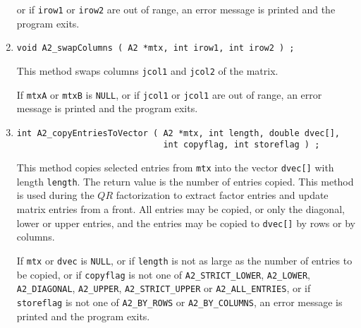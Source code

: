 \begin{enumerate}
or if {\tt irow1} or {\tt irow2} are out of range,
an error message is printed and the program exits.
\item
\begin{verbatim}
void A2_swapColumns ( A2 *mtx, int irow1, int irow2 ) ;
\end{verbatim}
This method swaps columns {\tt jcol1} and {\tt jcol2} of the matrix.
\par {}
If {\tt mtxA} or {\tt mtxB} is {\tt NULL},
or if {\tt jcol1} or {\tt jcol1} are out of range,
an error message is printed and the program exits.
\item
\begin{verbatim}
int A2_copyEntriesToVector ( A2 *mtx, int length, double dvec[],
                             int copyflag, int storeflag ) ;
\end{verbatim}
This method copies selected entries from {\tt mtx} into the vector
{\tt dvec[]} with length {\tt length}.
The return value is the number of entries copied.
This method is used during the $QR$ factorization to extract factor
entries and update matrix entries from a front.
All entries may be copied, or
only the diagonal, lower or upper entries,
and the entries may be copied to {\tt dvec[]} by rows or by
columns.
\par {}
If {\tt mtx} or {\tt dvec} is {\tt NULL},
or if {\tt length} is not as large as the number of entries to be
copied,
or if {\tt copyflag} is not one of {\tt A2\_STRICT\_LOWER},
{\tt A2\_LOWER}, {\tt A2\_DIAGONAL}, {\tt A2\_UPPER},
{\tt A2\_STRICT\_UPPER} or {\tt A2\_ALL\_ENTRIES},
or if {\tt storeflag} is not one of {\tt A2\_BY\_ROWS}
or {\tt A2\_BY\_COLUMNS},
an error message is printed and the program exits.
\end{enumerate}
\par
